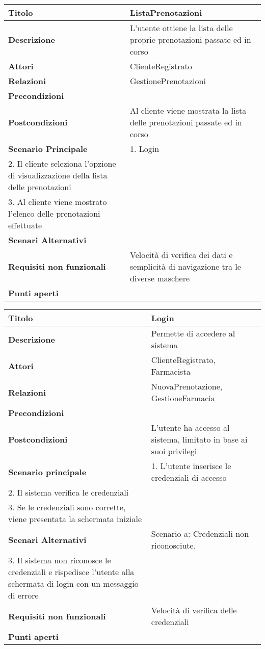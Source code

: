 \begin{tabular} {|P{4.5cm}|P{12.5cm}|}
\hline
  \textbf{Titolo} & ListaPrenotazioni\\
\hline
  \textbf{Descrizione} & L'utente ottiene la lista delle proprie prenotazioni passate ed in corso\\
\hline
 \textbf{Attori} & ClienteRegistrato\\
\hline
  \textbf{Relazioni} & GestionePrenotazioni\\
\hline
  \textbf{Precondizioni} &\\
\hline
  \textbf{Postcondizioni} & Al cliente viene mostrata la lista delle prenotazioni passate ed in corso\\
\hline
  \textbf{Scenario Principale} & 1. Login \\ 2. Il cliente seleziona l'opzione di visualizzazione della lista delle prenotazioni \\ 3. Al cliente viene mostrato l'elenco delle prenotazioni effettuate\\
\hline
  \textbf{Scenari Alternativi} &\\
\hline
  \textbf{Requisiti non funzionali} & Velocità di verifica dei dati e semplicità di navigazione tra le diverse maschere\\
\hline
  \textbf{Punti aperti} &\\
\hline
\end{tabular}
\hfill
\break

\begin{tabular} {|P{4.5cm}|P{12.5cm}|}
\hline
  \textbf{Titolo} & Login\\
\hline
  \textbf{Descrizione} & Permette di accedere al sistema\\
\hline
  \textbf{Attori} & ClienteRegistrato, Farmacista\\
\hline
  \textbf{Relazioni} & NuovaPrenotazione, GestioneFarmacia\\
\hline
  \textbf{Precondizioni} &\\
\hline
  \textbf{Postcondizioni} & L'utente ha accesso al sistema, limitato in base ai suoi privilegi\\
\hline
  \textbf{Scenario principale} & 1. L'utente inserisce le credenziali di accesso \\ 2. Il sistema verifica le credenziali \\ 3. Se le credenziali sono corrette, viene presentata la schermata iniziale\\
\hline
  \textbf{Scenari Alternativi} & Scenario a: Credenziali non riconosciute. \\ 3. Il sistema non riconosce le credenziali e rispedisce l'utente alla schermata di login con un messaggio di errore\\
\hline
  \textbf{Requisiti non funzionali} & Velocità di verifica delle credenziali\\
\hline
  \textbf{Punti aperti} &\\
\hline
\end{tabular}
\hfill
\break

